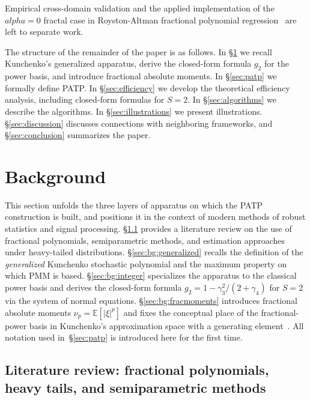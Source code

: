 \documentclass[11pt]{article}
\def\alpha{alpha}%
\theoremstyle{definition}
\newcommand{\E}{\mathbb{E}}
\begin{document}
Empirical cross-domain validation and the applied implementation of the
$\alpha = 0$ fractal case in Royston-Altman fractional polynomial
regression~\citep{royston1994} are left to separate work.

The structure of the remainder of the paper is as follows. In
\S\ref{sec:background} we recall Kunchenko's generalized apparatus, derive
the closed-form formula $g_2$ for the power basis, and introduce fractional
absolute moments. In \S\ref{sec:patp} we formally define PATP. In
\S\ref{sec:efficiency} we develop the theoretical efficiency analysis,
including closed-form formulas for $S = 2$. In \S\ref{sec:algorithms} we
describe the algorithms. In \S\ref{sec:illustrations} we present
illustrations. \S\ref{sec:discussion} discusses connections with neighboring
frameworks, and \S\ref{sec:conclusion} summarizes the paper.


\section{Background}\label{sec:background}

This section unfolds the three layers of apparatus on which the PATP
construction is built, and positions it in the context of modern methods of
robust statistics and signal processing.
\S\ref{sec:bg:literature} provides a literature review on the use of
fractional polynomials, semiparametric methods, and estimation approaches
under heavy-tailed distributions.
\S\ref{sec:bg:generalized} recalls the definition of the \emph{generalized}
Kunchenko stochastic polynomial and the maximum property on which PMM is
based. \S\ref{sec:bg:integer} specializes the apparatus to the classical
power basis and derives the closed-form formula
$g_2 = 1 - \gamma_3^2/(2+\gamma_4)$ for $S=2$ via the system of normal
equations. \S\ref{sec:bg:fracmoments} introduces fractional absolute moments
$\nu_p = \E[|\xi|^p]$ and fixes the conceptual place of the fractional-power
basis in Kunchenko's approximation space with a generating
element~\citep{kunchenko2005poligen}. All notation used in~\S\ref{sec:patp}
is introduced here for the first time.

\subsection{Literature review: fractional polynomials, heavy tails, and semiparametric methods}\label{sec:bg:literature}
\end{document}
